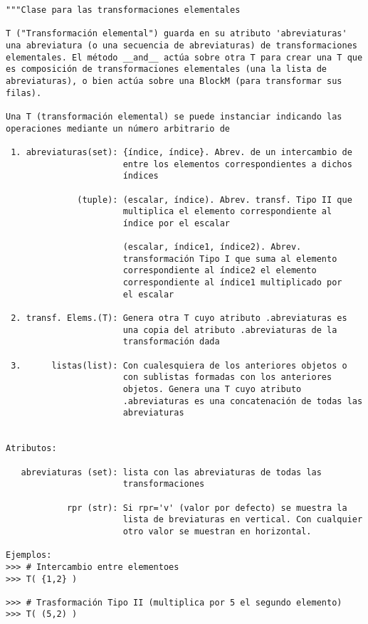 \documentclass[11pt]{report}
\begin{document}
\begin{verbatim}
"""Clase para las transformaciones elementales

T ("Transformación elemental") guarda en su atributo 'abreviaturas'
una abreviatura (o una secuencia de abreviaturas) de transformaciones
elementales. El método __and__ actúa sobre otra T para crear una T que
es composición de transformaciones elementales (una la lista de
abreviaturas), o bien actúa sobre una BlockM (para transformar sus
filas).

Una T (transformación elemental) se puede instanciar indicando las
operaciones mediante un número arbitrario de

 1. abreviaturas(set): {índice, índice}. Abrev. de un intercambio de
                       entre los elementos correspondientes a dichos
                       índices

              (tuple): (escalar, índice). Abrev. transf. Tipo II que
                       multiplica el elemento correspondiente al
                       índice por el escalar

                       (escalar, índice1, índice2). Abrev.
                       transformación Tipo I que suma al elemento
                       correspondiente al índice2 el elemento
                       correspondiente al índice1 multiplicado por
                       el escalar

 2. transf. Elems.(T): Genera otra T cuyo atributo .abreviaturas es
                       una copia del atributo .abreviaturas de la
                       transformación dada

 3.      listas(list): Con cualesquiera de los anteriores objetos o
                       con sublistas formadas con los anteriores
                       objetos. Genera una T cuyo atributo
                       .abreviaturas es una concatenación de todas las
                       abreviaturas


Atributos:

   abreviaturas (set): lista con las abreviaturas de todas las
                       transformaciones

            rpr (str): Si rpr='v' (valor por defecto) se muestra la
                       lista de breviaturas en vertical. Con cualquier
                       otro valor se muestran en horizontal.

Ejemplos:
>>> # Intercambio entre elementoes
>>> T( {1,2} )

>>> # Trasformación Tipo II (multiplica por 5 el segundo elemento)
>>> T( (5,2) )


\end{verbatim}
\end{document}
